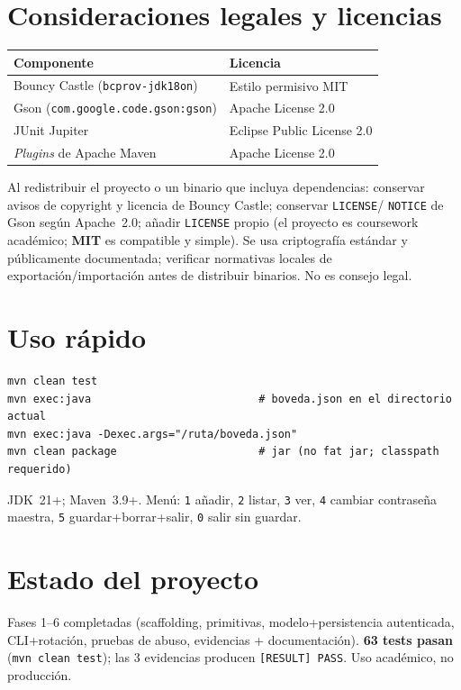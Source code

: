 \documentclass[11pt,a4paper]{article}
\begin{document}
\section{Consideraciones legales y licencias}
\begin{tabular}{@{}ll@{}}
\toprule
Componente & Licencia \\
\midrule
Bouncy Castle (\texttt{bcprov-jdk18on}) & Estilo permisivo MIT \\
Gson (\texttt{com.google.code.gson:gson}) & Apache License 2.0 \\
JUnit Jupiter & Eclipse Public License 2.0 \\
\emph{Plugins} de Apache Maven & Apache License 2.0 \\
\bottomrule
\end{tabular}

\bigskip
Al redistribuir el proyecto o un binario que incluya dependencias: conservar
avisos de copyright y licencia de Bouncy Castle; conservar \texttt{LICENSE}/
\texttt{NOTICE} de Gson según Apache~2.0; añadir \texttt{LICENSE} propio (el
proyecto es coursework académico; \textbf{MIT} es compatible y simple). Se usa
criptografía estándar y públicamente documentada; verificar normativas locales de
exportación/importación antes de distribuir binarios. No es consejo legal.

\section{Uso rápido}
\begin{lstlisting}
mvn clean test
mvn exec:java                          # boveda.json en el directorio actual
mvn exec:java -Dexec.args="/ruta/boveda.json"
mvn clean package                      # jar (no fat jar; classpath requerido)
\end{lstlisting}
JDK~21+; Maven~3.9+. Menú: \texttt{1} añadir, \texttt{2} listar, \texttt{3} ver,
\texttt{4} cambiar contraseña maestra, \texttt{5} guardar+borrar+salir,
\texttt{0} salir sin guardar.

\appendix
\section{Estado del proyecto}
Fases 1--6 completadas (scaffolding, primitivas, modelo+persistencia autenticada,
CLI+rotación, pruebas de abuso, evidencias + documentación).
\textbf{63 tests pasan} (\texttt{mvn clean test}); las 3 evidencias producen
\texttt{[RESULT] PASS}. Uso académico, no producción.
\end{document}
